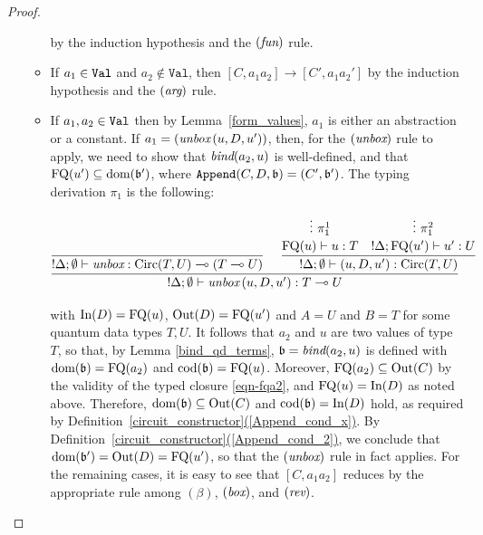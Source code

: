 \documentclass[twoside]{article}
\begin{document}
\begin{proof}
\begin{enumerate}
\begin{itemize}
    by the induction hypothesis and the $(\textit{fun})$ rule.
    \item If $a_1\in\texttt{Val}$ and $a_2\notin\mathtt{Val}$, then 
    $[C,a_1a_2]\to[C',a_1a_2']$ by the induction hypothesis and 
    the $(\textit{arg})$ rule.
    \item If $a_1,a_2\in\texttt{Val}$ then by 
    Lemma~\hyperref[form_values]{\ref*{form_values}}, $a_1$ is either 
    an abstraction or a constant. If $a_1=(\mathop{\textit{unbox}}\nolimits\,(u,D,u'))$, then, 
    for the $(\mathop{\textit{unbox}}\nolimits)$ rule to apply, we need to show that 
    $\mathop{\textit{bind}}\nolimits(a_2,u)$ is well-defined, and that $\mathop{\textrm{FQ}}\nolimits(u')\subseteq\mathop{\textrm{\rm dom}}\nolimits(\mathfrak{b}')$, where $\mathtt{Append}(C,D,\mathfrak{b})=(C',\mathfrak{b}')$.  
    The typing derivation $\pi_1$ is the following:
    \begin{footnotesize}
    \[
      \infer[]{{!}\Delta;\emptyset\entails \unbox\,(u,D,u'):T\loli U}{
        \infer[]{{!}\Delta;\emptyset \entails \unbox:\Circ(T,U)\loli (T\loli U)}{
        }   
        &
        \infer[]{{!}\Delta ;\emptyset\entails (u,D,u'):\Circ(T,U)}{
          \deduce[]{\FQ(u)\entails u:T}{
            \vdots ~\pi_1^1
          }
          &
          \deduce[]{{!}\Delta;\FQ(u')\entails u':U}{
            \vdots ~\pi_1^2     
          }
        }
      }
      \]
    \end{footnotesize}%
    with $\mathop{\textrm{In}}\nolimits(D)=\mathop{\textrm{FQ}}\nolimits(u)$, $\mathop{\textrm{Out}}\nolimits(D)=\mathop{\textrm{FQ}}\nolimits(u')$ and $A=U$ and $B=T$ for some quantum 
    data types $T,U$. It follows that $a_2$ and $u$ are two values of type $T$, 
    so that, by Lemma \hyperref[bind_qd_terms]{\ref*{bind_qd_terms}}, $\mathfrak{b}=\mathop{\textit{bind}}\nolimits(a_2,u)$
    is defined with $\mathop{\textrm{\rm dom}}\nolimits(\mathfrak{b})=\mathop{\textrm{FQ}}\nolimits(a_2)$ and $\mathop{\textrm{\rm cod}}\nolimits(\mathfrak{b})=\mathop{\textrm{FQ}}\nolimits(u)$. Moreover, $\mathop{\textrm{FQ}}\nolimits(a_2)\subseteq\mathop{\textrm{Out}}\nolimits(C)$ by the validity of the typed closure {\eqref{eqn-fqa2}}, and $\mathop{\textrm{FQ}}\nolimits(u)=\mathop{\textrm{In}}\nolimits(D)$ as noted above. Therefore, $\mathop{\textrm{\rm dom}}\nolimits(\mathfrak{b})\subseteq\mathop{\textrm{Out}}\nolimits(C)$ and $\mathop{\textrm{\rm cod}}\nolimits(\mathfrak{b})=\mathop{\textrm{In}}\nolimits(D)$ hold, as required by Definition~\hyperref[Append_cond_2]
    {\ref*{circuit_constructor}(\ref*{Append_cond_x})}. By 
Definition~\hyperref[Append_cond_2]
    {\ref*{circuit_constructor}(\ref*{Append_cond_2})}, we conclude that $\mathop{\textrm{\rm dom}}\nolimits(\mathfrak{b}')=\mathop{\textrm{Out}}\nolimits(D)
    =\mathop{\textrm{FQ}}\nolimits(u')$, so that the $(\mathop{\textit{unbox}}\nolimits)$ rule in fact applies. For the remaining cases, 
    it is easy to see that $[C,a_1a_2]$ reduces by the appropriate rule among $(\beta)$, 
    $(\mathop{\textit{box}}\nolimits)$, and $(\mathop{\textit{rev}}\nolimits)$. 
  \end{itemize}
\end{enumerate}
\end{proof}

\clearpage
\end{document}
